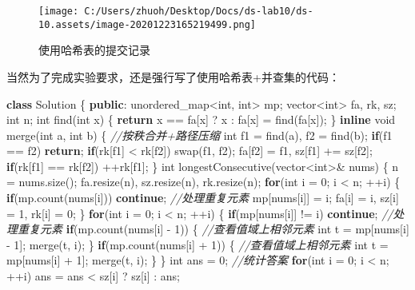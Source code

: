 \documentclass[]{article}
\newenvironment{Shaded}{}{}
\newcommand{\CommentTok}[1]{\textcolor[rgb]{0.38,0.63,0.69}{\textit{#1}}}
\newcommand{\ControlFlowTok}[1]{\textcolor[rgb]{0.00,0.44,0.13}{\textbf{#1}}}
\newcommand{\DataTypeTok}[1]{\textcolor[rgb]{0.56,0.13,0.00}{#1}}
\newcommand{\DecValTok}[1]{\textcolor[rgb]{0.25,0.63,0.44}{#1}}
\newcommand{\KeywordTok}[1]{\textcolor[rgb]{0.00,0.44,0.13}{\textbf{#1}}}
\newcommand{\NormalTok}[1]{#1}
\begin{document}
\begin{figure}
\centering
\texttt{[image: C:/Users/zhuoh/Desktop/Docs/ds-lab10/ds-10.assets/image-20201223165219499.png]}
\caption{使用哈希表的提交记录}
\end{figure}

当然为了完成实验要求，还是强行写了使用哈希表+并查集的代码：

\begin{Shaded}
\begin{Highlighting}[]
\KeywordTok{class}\NormalTok{ Solution \{}
\KeywordTok{public}\NormalTok{:}
\NormalTok{    unordered_map<}\DataTypeTok{int}\NormalTok{, }\DataTypeTok{int}\NormalTok{> mp;}
\NormalTok{    vector<}\DataTypeTok{int}\NormalTok{> fa, rk, sz;}
    \DataTypeTok{int}\NormalTok{ n;}
    \DataTypeTok{int}\NormalTok{ find(}\DataTypeTok{int}\NormalTok{ x) \{}
        \ControlFlowTok{return}\NormalTok{ x == fa[x] ? x : fa[x] = find(fa[x]);}
\NormalTok{    \}}
    \KeywordTok{inline} \DataTypeTok{void}\NormalTok{ merge(}\DataTypeTok{int}\NormalTok{ a, }\DataTypeTok{int}\NormalTok{ b) \{ }\CommentTok{//按秩合并+路径压缩}
        \DataTypeTok{int}\NormalTok{ f1 = find(a), f2 = find(b);}
        \ControlFlowTok{if}\NormalTok{(f1 == f2) }\ControlFlowTok{return}\NormalTok{;}
        \ControlFlowTok{if}\NormalTok{(rk[f1] < rk[f2]) swap(f1, f2);}
\NormalTok{        fa[f2] = f1, sz[f1] += sz[f2];}
        \ControlFlowTok{if}\NormalTok{(rk[f1] == rk[f2]) ++rk[f1];}
\NormalTok{    \}}
    \DataTypeTok{int}\NormalTok{ longestConsecutive(vector<}\DataTypeTok{int}\NormalTok{>& nums) \{}
\NormalTok{        n = nums.size();}
\NormalTok{        fa.resize(n), sz.resize(n), rk.resize(n);}
        \ControlFlowTok{for}\NormalTok{(}\DataTypeTok{int}\NormalTok{ i = }\DecValTok{0}\NormalTok{; i < n; ++i) \{}
            \ControlFlowTok{if}\NormalTok{(mp.count(nums[i])) }\ControlFlowTok{continue}\NormalTok{; }\CommentTok{//处理重复元素}
\NormalTok{            mp[nums[i]] = i;}
\NormalTok{            fa[i] = i, sz[i] = }\DecValTok{1}\NormalTok{, rk[i] = }\DecValTok{0}\NormalTok{;}
\NormalTok{        \}}
        \ControlFlowTok{for}\NormalTok{(}\DataTypeTok{int}\NormalTok{ i = }\DecValTok{0}\NormalTok{; i < n; ++i) \{}
            \ControlFlowTok{if}\NormalTok{(mp[nums[i]] != i) }\ControlFlowTok{continue}\NormalTok{; }\CommentTok{//处理重复元素}
            \ControlFlowTok{if}\NormalTok{(mp.count(nums[i] - }\DecValTok{1}\NormalTok{)) \{ }\CommentTok{//查看值域上相邻元素}
                \DataTypeTok{int}\NormalTok{ t = mp[nums[i] - }\DecValTok{1}\NormalTok{];}
\NormalTok{                merge(t, i);}
\NormalTok{            \}}
            \ControlFlowTok{if}\NormalTok{(mp.count(nums[i] + }\DecValTok{1}\NormalTok{)) \{ }\CommentTok{//查看值域上相邻元素}
                \DataTypeTok{int}\NormalTok{ t = mp[nums[i] + }\DecValTok{1}\NormalTok{];}
\NormalTok{                merge(t, i);}
\NormalTok{            \}}
\NormalTok{        \}}
        \DataTypeTok{int}\NormalTok{ ans = }\DecValTok{0}\NormalTok{; }\CommentTok{//统计答案}
        \ControlFlowTok{for}\NormalTok{(}\DataTypeTok{int}\NormalTok{ i = }\DecValTok{0}\NormalTok{; i < n; ++i) ans = ans < sz[i] ? sz[i] : ans;}
        

\end{Highlighting}
\end{Shaded}
\end{document}
